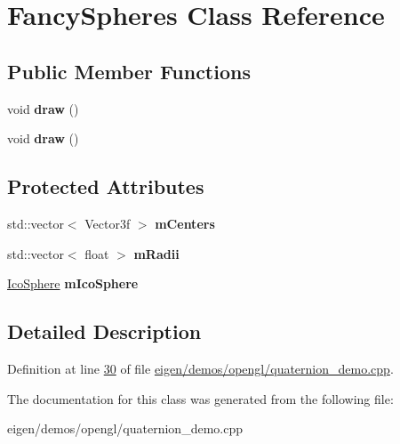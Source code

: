 \hypertarget{class_fancy_spheres}{}\section{Fancy\+Spheres Class Reference}
\label{class_fancy_spheres}
\subsection*{Public Member Functions}
\begin{DoxyCompactItemize}
\item 
\mbox{\label{class_fancy_spheres_a1621bf349aa1a2df706b8c08356aeb35}} 
void {\bfseries draw} ()
\item 
\mbox{\label{class_fancy_spheres_a1621bf349aa1a2df706b8c08356aeb35}} 
void {\bfseries draw} ()
\end{DoxyCompactItemize}
\subsection*{Protected Attributes}
\begin{DoxyCompactItemize}
\item 
\mbox{\label{class_fancy_spheres_ab6519ecf80585505bbe8cb832c6c6f52}} 
std\+::vector$<$ Vector3f $>$ {\bfseries m\+Centers}
\item 
\mbox{\label{class_fancy_spheres_ab4beb428f5c08ba810eaefcba8f03e5b}} 
std\+::vector$<$ float $>$ {\bfseries m\+Radii}
\item 
\mbox{\label{class_fancy_spheres_ae6342364e86b6d69a3962bc6c2cd1664}} 
\hyperlink{class_ico_sphere}{Ico\+Sphere} {\bfseries m\+Ico\+Sphere}
\end{DoxyCompactItemize}


\subsection{Detailed Description}


Definition at line \hyperlink{eigen_2demos_2opengl_2quaternion__demo_8cpp_source_l00030}{30} of file \hyperlink{eigen_2demos_2opengl_2quaternion__demo_8cpp_source}{eigen/demos/opengl/quaternion\+\_\+demo.\+cpp}.



The documentation for this class was generated from the following file\+:\begin{DoxyCompactItemize}
\item 
eigen/demos/opengl/quaternion\+\_\+demo.\+cpp\end{DoxyCompactItemize}
